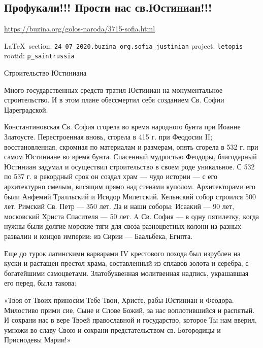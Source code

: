  
 
\subsection{Профукали!!! Прости нас св.Юстиниан!!!}
\label{sec:24_07_2020.buzina_org.sofia_justinian}
\url{https://buzina.org/golos-naroda/3715-sofia.html}
  
\vspace{0.5cm}
 {\ifDEBUG\small\LaTeX~section: \verb|24_07_2020.buzina_org.sofia_justinian| project: \verb|letopis| rootid: \verb|p_saintrussia| \fi}
\vspace{0.5cm}


Строительство Юстиниана

Много государственных средств тратил Юстиниан на монументальное строительство.
И в этом плане обессмертил себя созданием Св. Софии Цареградской.

Константиновская Св. София сгорела во время народного бунта при Иоанне
Златоусте. Перестроенная вновь, сгорела в 415 г. при Феодосии II;
восстановленная, скромная по материалам и размерам, опять сгорела в 532 г. при
самом Юстиниане во время бунта. Спасенный мудростью Феодоры, благодарный
Юстиниан задумал и осуществил строительство в своем роде уникальное. С 532 по
537 г. в рекордный срок он создал храм --- чудо истории --- с его архитектурно
смелым, висящим прямо над стенами куполом. Архитекторами его были Анфемий
Тралльский и Исидор Милетский. Кельнский собор строился 500 лет. Римский Св.
Петр --- 350 лет. Да и наши соборы: Исаакий --- 90 лет, московский Христа Спасителя
--- 50 лет. A Св. София --- в одну пятилетку, когда нужны были долгие морские тяги
для своза разноцветных колонн из разных развалин и концов империи: из Сирии ---
Баальбека, Египта.

Еще до турок латинскими варварами IV крестового похода был изрублен на куски и
растащен престол храма, составленный из сплавов золота и серебра, с богатейшими
самоцветами. Златобуквенная молитвенная надпись, украшавшая его перед, была
такова:

«Твоя от Твоих приносим Тебе Твои, Христе, рабы Юстиниан и Феодора. Милостиво
прими сие, Сыне и Слове Божий, за нас воплотившийся и распятый. И сохрани нас в
вере Твоей православной и государство, которое Ты нам вверил, умножи во славу
Свою и сохрани предстательством св. Богородицы и Приснодевы Марии!»

